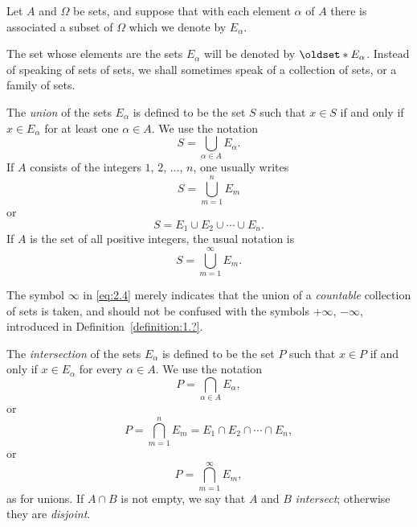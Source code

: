 \begin{definition}
    Let \(A\) and \(\Omega\) be sets, and suppose that with each element \(\alpha\) of \(A\) there is associated a subset of \(\Omega\) which we denote by \(E_\alpha\).
    
    The set whose elements are the sets \(E_\alpha\) will be denoted by \(\set{E_\alpha}\). Instead of speaking of sets of sets, we shall sometimes speak of a collection of sets, or a family of sets.
    
    The \emph{union} of the sets \(E_\alpha\) is defined to be the set \(S\) such that \(x\in S\) if and only if \(x\in E_\alpha\) for at least one \(\alpha\in A\). We use the notation
    \begin{equation}
        S=\bigcup_{\alpha\in A}E_\alpha.
    \end{equation}
    If \(A\) consists of the integers \(1\), \(2\), \(\ldots\), \(n\), one usually writes
    \begin{equation}
        S=\bigcup_{m=1}^nE_m
    \end{equation}
    or
    \begin{equation}
        S=E_1\cup E_2\cup\cdots\cup E_n.\label{eq:2.3}
    \end{equation}
    If \(A\) is the set of all positive integers, the usual notation is
    \begin{equation}
        S=\bigcup_{m=1}^\infty E_m.\label{eq:2.4}
    \end{equation}

    The symbol \(\infty\) in \eqref{eq:2.4} merely indicates that the union of a \emph{countable} collection of sets is taken, and should not be confused with the symbols \(+\infty\), \(-\infty\), introduced in Definition~\ref{definition:1.?}.
    
    The \emph{intersection} of the sets \(E_\alpha\) is defined to be the set \(P\) such that \(x\in P\) if and only if \(x\in E_\alpha\) for every \(\alpha\in A\). We use the notation
    \begin{equation}
        P=\bigcap_{\alpha\in A}E_\alpha,
    \end{equation}
    or
    \begin{equation}
        P=\bigcap_{m=1}^nE_m=E_1\cap E_2\cap\cdots\cap E_n,\label{eq:2.6}
    \end{equation}
    or
    \begin{equation}
        P=\bigcap_{m=1}^\infty E_m,
    \end{equation}
    as for unions. If \(A\cap B\) is not empty, we say that \(A\) and \(B\) \emph{intersect}; otherwise they are \emph{disjoint}.
\end{definition}

